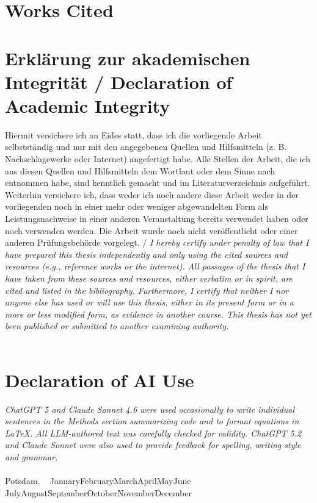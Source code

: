 \documentclass[12pt,a4paper]{article}
\newcommand{\MonthName}{%
  \ifcase\month
  \or January\or February\or March\or April\or May\or June%
  \or July\or August\or September\or October\or November\or December%
  \fi
}
\newcommand{\DateDDMonthYYYY}{\number\day~\MonthName~\number\year}
\begin{document}
\clearpage


\section*{Works Cited}
\printbibliography

\clearpage
\section*{Erklärung zur akademischen Integrität / Declaration of Academic Integrity}
Hiermit versichere ich an Eides statt, dass ich die vorliegende Arbeit selbstständig und nur mit den angegebenen Quellen und Hilfsmitteln (z. B. Nachschlagewerke oder Internet) angefertigt habe. Alle Stellen der Arbeit, die ich aus diesen Quellen und Hilfsmitteln dem Wortlaut oder dem Sinne nach entnommen habe, sind kenntlich gemacht und im Literaturverzeichnis aufgeführt. Weiterhin versichere ich, dass weder ich noch andere diese Arbeit weder in der vorliegenden noch in einer mehr oder weniger abgewandelten Form als Leistungsnachweise in einer anderen Veranstaltung bereits verwendet haben oder noch verwenden werden. Die Arbeit wurde noch nicht veröffentlicht oder einer anderen Prüfungsbehörde vorgelegt. / \emph{I hereby certify under penalty of law that I have prepared this thesis independently and only using the cited sources and resources (e.g., reference works or the internet). All passages of the thesis that I have taken from these sources and resources, either verbatim or in spirit, are cited and listed in the bibliography. Furthermore, I certify that neither I nor anyone else has used or will use this thesis, either in its present form or in a more or less modified form, as evidence in another course. This thesis has not yet been published or submitted to another examining authority.} \\
\\
\section*{Declaration of AI Use}
 \emph{ChatGPT 5 and Claude Sonnet 4.6 were used occasionally to write individual sentences in the Methods section summarizing code and to format equations in \LaTeX. All LLM-authored text was carefully checked for validity. ChatGPT 5.2 and Claude Sonnet were also used to provide feedback for spelling, writing style and grammar.}\\
\\
Potsdam, \DateDDMonthYYYY
\end{document}
